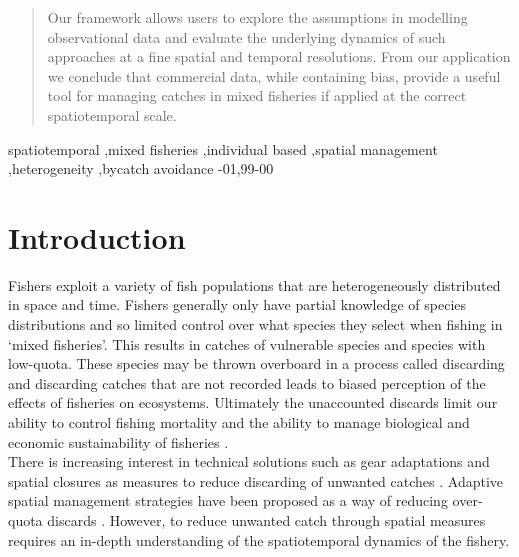 \documentclass[preprint]{elsarticle}
\begin{document}
\begin{frontmatter}
\begin{abstract}
Our framework allows users to explore the assumptions in modelling
observational data and evaluate the underlying dynamics of such approaches at a
fine spatial and temporal resolutions. From our application we conclude that
commercial data, while containing bias, provide a useful tool for managing
catches in mixed fisheries if applied at the correct spatiotemporal scale. \\
\end{abstract}

\begin{keyword}
spatiotemporal \sep mixed fisheries \sep individual based \sep spatial
management \sep heterogeneity \sep bycatch avoidance 
-01\sep  99-00
\end{keyword}

\end{frontmatter}

\linenumbers

\section{Introduction}

Fishers exploit a variety of fish populations that are heterogeneously
distributed in space and time. Fishers generally only have partial knowledge of
species distributions and so limited control over what species they select when
fishing in `mixed fisheries'. This results in catches of vulnerable species and
species with low-quota. These species may be thrown overboard in a process
called discarding and discarding catches that are not recorded leads to biased
perception of the effects of fisheries on ecosystems. Ultimately the
unaccounted discards limit our ability to control fishing mortality
\citep{Alverson1994, Crowder1998, Rijnsdorp2007} and the ability to manage
biological and economic sustainability of fisheries \citep{Ulrich2011a,
	Batsleer2015}.\\

There is increasing interest in technical solutions such as gear adaptations
and spatial closures as measures to reduce discarding of unwanted catches
\citep{Kennelly2002, Catchpole2008, Bellido2011, Cosgrove2019}. Adaptive
spatial management strategies have been proposed as a way of reducing
over-quota discards \citep{Holmes2011, Little2014, Dunn2014a}. However, to
reduce unwanted catch through spatial measures requires an in-depth
understanding of the spatiotemporal dynamics of the fishery. \\
\end{document}

